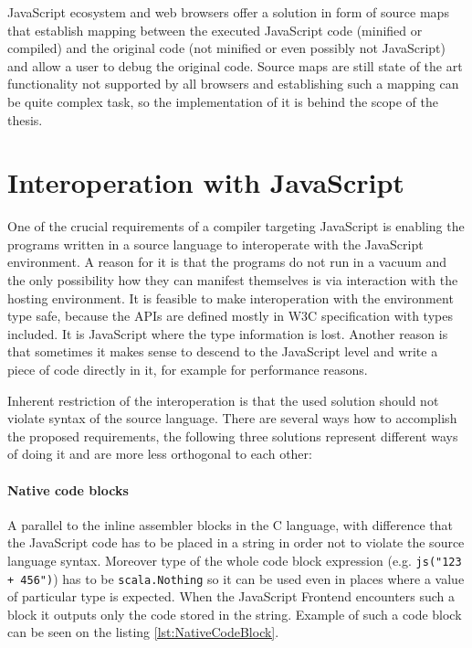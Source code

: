 \documentclass[12pt,a4paper]{report}
\begin{document}
JavaScript ecosystem and web browsers offer a solution in form of source maps\cite{SourceMaps} that establish mapping between the executed JavaScript code (minified or compiled) and the original code (not minified or even possibly not JavaScript) and allow a user to debug the original code. Source maps are still state of the art functionality not supported by all browsers and establishing such a mapping can be quite complex task, so the implementation of it is behind the scope of the thesis.

\section{Interoperation with JavaScript}

One of the crucial requirements of a compiler targeting JavaScript is enabling the programs written in a source language to interoperate with the JavaScript environment. A reason for it is that the programs do not run in a vacuum and the only possibility how they can manifest themselves is via interaction with the hosting environment. It is feasible to make interoperation with the environment type safe, because the APIs are defined mostly in W3C\cite{W3c} specification with types included. It is JavaScript where the type information is lost. Another reason is that sometimes it makes sense to descend to the JavaScript level and write a piece of code directly in it, for example for performance reasons. 

Inherent restriction of the interoperation is that the used solution should not violate syntax of the source language. There are several ways how to accomplish the proposed requirements, the following three solutions represent different ways of doing it and are more less orthogonal to each other: 

\paragraph{Native code blocks} A parallel to the inline assembler blocks in the C language, with difference that the JavaScript code has to be placed in a string in order not to violate the source language syntax. Moreover type of the whole code block expression (e.g. \texttt{js("123 + 456")}) has to be \texttt{scala.Nothing} so it can be used even in places where a value of particular type is expected. When the JavaScript Frontend encounters such a block it outputs only the code stored in the string. Example of such a code block can be seen on the listing \ref{lst:NativeCodeBlock}.
\end{document}
